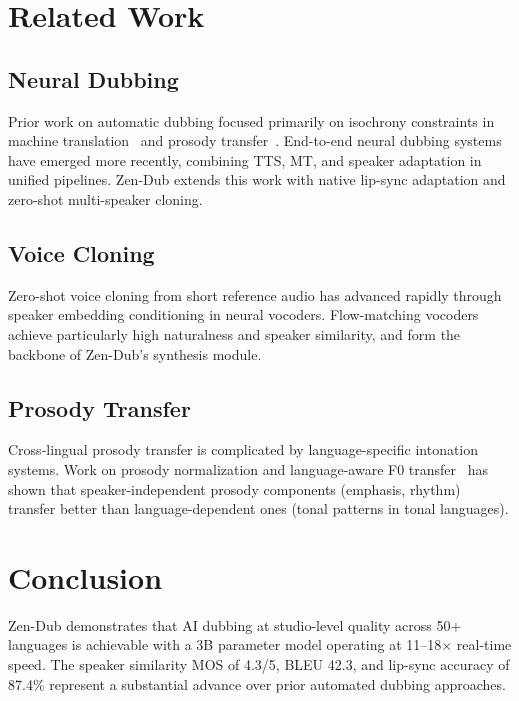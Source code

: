 \documentclass[11pt,a4paper]{article}
\begin{document}
\section{Related Work}
\label{sec:related}

\subsection{Neural Dubbing}

Prior work on automatic dubbing focused primarily on isochrony constraints in
machine translation~\cite{zetterholm2004} and prosody transfer~\cite{Federico2020}.
End-to-end neural dubbing systems have emerged more recently, combining TTS, MT,
and speaker adaptation in unified pipelines. Zen-Dub extends this work with
native lip-sync adaptation and zero-shot multi-speaker cloning.

\subsection{Voice Cloning}

Zero-shot voice cloning from short reference audio has advanced rapidly through
speaker embedding conditioning in neural vocoders. Flow-matching vocoders~\cite{vits2}
achieve particularly high naturalness and speaker similarity, and form the backbone
of Zen-Dub's synthesis module.

\subsection{Prosody Transfer}

Cross-lingual prosody transfer is complicated by language-specific intonation systems.
Work on prosody normalization and language-aware F0 transfer~\cite{prosody} has shown
that speaker-independent prosody components (emphasis, rhythm) transfer better than
language-dependent ones (tonal patterns in tonal languages).

\section{Conclusion}
\label{sec:conclusion}

Zen-Dub demonstrates that AI dubbing at studio-level quality across 50+ languages
is achievable with a 3B parameter model operating at 11--18$\times$ real-time speed.
The speaker similarity MOS of 4.3/5, BLEU 42.3, and lip-sync accuracy of 87.4\%
represent a substantial advance over prior automated dubbing approaches.
\end{document}
